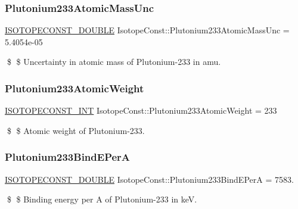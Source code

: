 \subsubsection{\texorpdfstring{Plutonium233\+Atomic\+Mass\+Unc}{Plutonium233AtomicMassUnc}}
{\footnotesize\ttfamily \mbox{\hyperlink{group___isotope_const-_macros_ga8f45a7272ce02c0b4c65c44636ed719a}{I\+S\+O\+T\+O\+P\+E\+C\+O\+N\+S\+T\+\_\+\+D\+O\+U\+B\+LE}} Isotope\+Const\+::\+Plutonium233\+Atomic\+Mass\+Unc = 5.\+4054e-\/05}

\$ \$ Uncertainty in atomic mass of Plutonium-\/233 in amu. \mbox{\label{group___isotope_const-_plutonium-_pu233_gae8877361be9733e2cae3ac00cbd1febc}} 
\subsubsection{\texorpdfstring{Plutonium233\+Atomic\+Weight}{Plutonium233AtomicWeight}}
{\footnotesize\ttfamily \mbox{\hyperlink{group___isotope_const-_macros_ga5f18360b3e99483a35c32d789e62621c}{I\+S\+O\+T\+O\+P\+E\+C\+O\+N\+S\+T\+\_\+\+I\+NT}} Isotope\+Const\+::\+Plutonium233\+Atomic\+Weight = 233}

\$ \$ Atomic weight of Plutonium-\/233. \mbox{\label{group___isotope_const-_plutonium-_pu233_ga35e9c0a89a039b7a766739585c100f28}} 
\subsubsection{\texorpdfstring{Plutonium233\+Bind\+E\+PerA}{Plutonium233BindEPerA}}
{\footnotesize\ttfamily \mbox{\hyperlink{group___isotope_const-_macros_ga8f45a7272ce02c0b4c65c44636ed719a}{I\+S\+O\+T\+O\+P\+E\+C\+O\+N\+S\+T\+\_\+\+D\+O\+U\+B\+LE}} Isotope\+Const\+::\+Plutonium233\+Bind\+E\+PerA = 7583.}

\$ \$ Binding energy per A of Plutonium-\/233 in keV. \mbox{\label{group___isotope_const-_plutonium-_pu233_ga235febee8d4ada631d51806300c70d4b}} 

